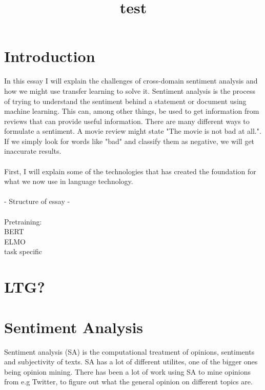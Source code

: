 \documentclass{report}
\begin{document}
\title{test}
\duoforside[author={Adrian Eriksen}, dept={Department of Informatics}, program={Language Technology}]

\setcounter{secnumdepth}{0}

\section{Introduction}
In this essay I will explain the challenges of cross-domain sentiment analysis and how we might use transfer learning to solve it.
Sentiment analysis is the process of trying to understand the sentiment behind a statement or document using machine learning. This can, among other things, be used to get information from reviews that can provide useful information.
There are many different ways to formulate a sentiment. A movie review might state "The movie is not bad at all.". If we simply look for words like "bad" and classify them as negative, we will get inaccurate results.\\\\
First, I will explain some of the technologies that has created the foundation for what we now use in language technology.
\\\\  - Structure of essay - \\\\
Pretraining:\\ 
BERT\\
ELMO\\
task specific\\



\newpage

\section{LTG?}

\newpage
\section{Sentiment Analysis}
Sentiment analysis (SA) is the computational treatment of opinions, sentiments and subjectivity of texts.
SA has a lot of different utilites, one of the bigger ones being opinion mining. There has been a lot of work using SA to mine opinions from e.g Twitter, to figure out what the general opinion on different topics are.
 \\\\ 

\noindent
\end{document}
